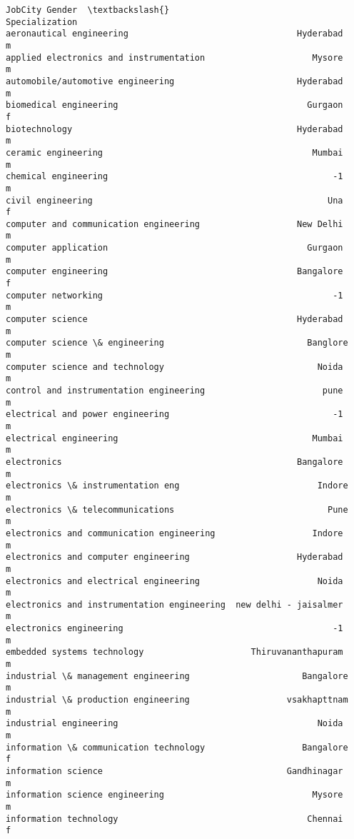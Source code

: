 \documentclass[11pt]{article}
\begin{document}
\begin{tcolorbox}[breakable, size=fbox, boxrule=.5pt, pad at break*=1mm, opacityfill=0]
\begin{Verbatim}[commandchars=\\\{\}]
                                                           JobCity Gender  \textbackslash{}
Specialization
aeronautical engineering                                 Hyderabad      m
applied electronics and instrumentation                     Mysore      m
automobile/automotive engineering                        Hyderabad      m
biomedical engineering                                     Gurgaon      f
biotechnology                                            Hyderabad      m
ceramic engineering                                         Mumbai      m
chemical engineering                                            -1      m
civil engineering                                              Una      f
computer and communication engineering                   New Delhi      m
computer application                                       Gurgaon      m
computer engineering                                     Bangalore      f
computer networking                                             -1      m
computer science                                         Hyderabad      m
computer science \& engineering                            Banglore      m
computer science and technology                              Noida      m
control and instrumentation engineering                       pune      m
electrical and power engineering                                -1      m
electrical engineering                                      Mumbai      m
electronics                                              Bangalore      m
electronics \& instrumentation eng                           Indore      m
electronics \& telecommunications                              Pune      m
electronics and communication engineering                   Indore      m
electronics and computer engineering                     Hyderabad      m
electronics and electrical engineering                       Noida      m
electronics and instrumentation engineering  new delhi - jaisalmer      m
electronics engineering                                         -1      m
embedded systems technology                     Thiruvananthapuram      m
industrial \& management engineering                      Bangalore      m
industrial \& production engineering                   vsakhapttnam      m
industrial engineering                                       Noida      m
information \& communication technology                   Bangalore      f
information science                                    Gandhinagar      m
information science engineering                             Mysore      m
information technology                                     Chennai      f

\end{Verbatim}
\end{tcolorbox}
\end{document}
